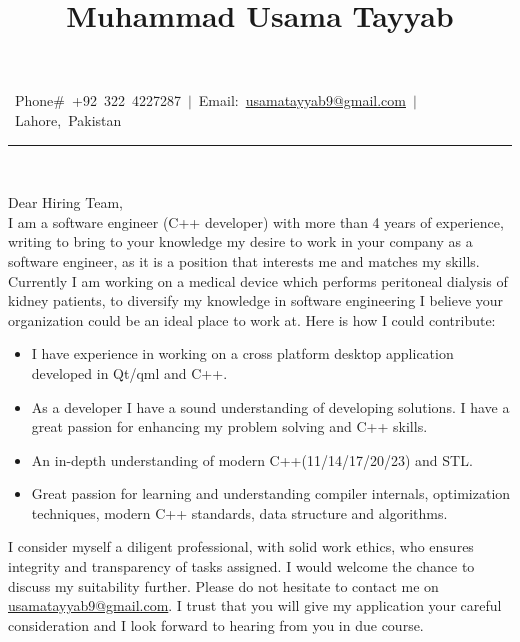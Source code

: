 \documentclass[9pt,a4paper]{article}
\title{\textbf{Muhammad Usama Tayyab}}
\date{}
\author{}
\newcommand{\MyHorizontalLine}{\noindent\rule{\textwidth}{1.5pt}\\}
\begin{document}
	\maketitle
	\vspace{-0.25in} %
	\centering\mbox{
		 Phone$\#$ +92 322 4227287
		 $\vert$ Email: \href{mailto:usamatayyab9@gmail.com} {usamatayyab9@gmail.com}
		 $\vert$
		 Lahore, Pakistan
	}
\MyHorizontalLine
\vspace{2mm}
\begin{justify}
	Dear Hiring Team,\\ \newline
	I am a software engineer (C++ developer) with more than 4 years of experience, writing to bring to your knowledge my desire to work in your company as a software engineer, as it is a position that interests me and matches my skills. Currently I am working on a medical device which performs peritoneal dialysis of kidney patients, to diversify my knowledge in software engineering I believe your organization could be an ideal place to work at. Here is how I could contribute:
	\begin{itemize}
		\item I have experience in working on a cross platform desktop application developed in Qt/qml and C++.
		\item As a developer I have a sound understanding of developing solutions. I have a great passion for enhancing my problem solving and C++ skills.
		\item An in-depth understanding of modern C++(11/14/17/20/23) and STL.
		\item Great passion for learning and understanding compiler internals, optimization techniques, modern C++ standards, data structure and algorithms.
	\end{itemize}
	I consider myself a diligent professional, with solid work ethics, who ensures integrity and transparency of tasks assigned. I would welcome the chance to discuss my suitability further. Please do not hesitate to contact me on \href{usamatayyab9@gmail.com}{usamatayyab9@gmail.com}. I trust that you will give my application your careful consideration and I look forward to hearing from you in due course.
\end{justify}
\end{document}
